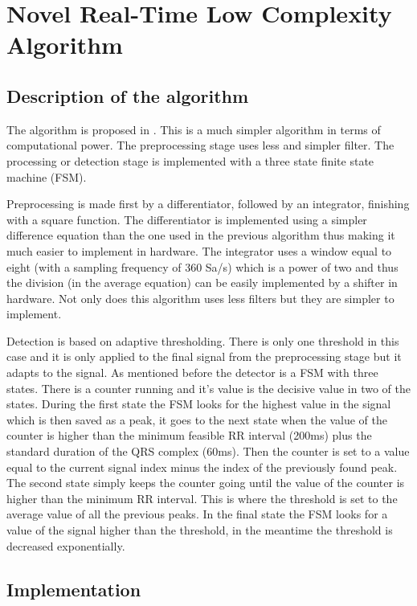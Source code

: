 \documentclass{article}
\begin{document}
\section{Novel Real-Time Low Complexity Algorithm}

\subsection{Description of the algorithm}

The algorithm is proposed in \cite{rivas}. This is a much simpler algorithm in terms of computational power. The preprocessing stage uses less and simpler filter. The processing or detection stage is implemented with a three state finite state machine (FSM).

Preprocessing is made first by a differentiator, followed by an integrator, finishing with a square function. The differentiator is implemented using a simpler difference equation than the one used in the previous algorithm thus making it much easier to implement in hardware. The integrator uses a window equal to eight (with a sampling frequency of 360 Sa/s) which is a power of two and thus the division (in the average equation) can be easily implemented by a shifter in hardware. Not only does this algorithm uses less filters but they are simpler to implement.

Detection is based on adaptive thresholding. There is only one threshold in this case and it is only applied to the final signal from the preprocessing stage but it adapts to the signal. As mentioned before the detector is a FSM with three states. There is a counter running and it's value is the decisive value in two of the states. During the first state the FSM looks for the highest value in the signal which is then saved as a peak, it goes to the next state when the value of the counter is higher than the minimum feasible RR interval (200ms) plus the standard duration of the QRS complex (60ms). Then the counter is set to a value equal to the current signal index minus the index of the previously found peak. The second state simply keeps the counter going  until the value of the counter is higher than the minimum RR interval. This is where the threshold is set to the average value of all the previous peaks. In the final state the FSM looks for a value of the signal higher than the threshold, in the meantime the threshold is decreased exponentially. 

\subsection{Implementation}
\end{document}
